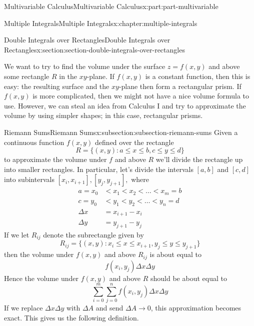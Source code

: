 \documentclass[twoside,10pt,]{tufte-book}
\numberwithin{equation}{part}
\begin{document}
\begin{partptx}{Multivariable Calculus}{}{Multivariable Calculus}{}{}{x:part:part-multivariable}
\begin{chapterptx}{Multiple Integrals}{}{Multiple Integrals}{}{}{x:chapter:multiple-integrals}
\begin{sectionptx}{Double Integrals over Rectangles}{}{Double Integrals over Rectangles}{}{}{x:section:section-double-integrals-over-rectangles}
\begin{introduction}{}%
We want to try to find the volume under the surface \(z = f(x,y)\) and above some rectangle \(R\) in the \(xy\)-plane. If \(f(x,y)\) is a constant function, then this is easy: the resulting surface and the \(xy\)-plane then form a rectangular prism. If \(f(x,y)\) is more complicated, then we might not have a nice volume formula to use. However, we can steal an idea from Calculus I and try to approximate the volume by using simpler shapes; in this case, rectangular prisms.%
\end{introduction}%
%
%
\typeout{************************************************}
\typeout{************************************************}
%
\begin{subsectionptx}{Riemann Sums}{}{Riemann Sums}{}{}{x:subsection:subsection-riemann-sums}
Given a continuous function \(f(x,y)\) defined over the rectangle%
\begin{equation*}
R = \{(x,y) : a\leq x\leq b, c\leq y\leq d\}
\end{equation*}
to approximate the volume under \(f\) and above \(R\) we'll divide the rectangle up into smaller rectangles. In particular, let's divide the intervals \([a,b]\) and \([c,d]\) into subintervals \([x_{i},x_{i+1}], [y_{j},y_{j+1}],\) where%
\begin{align*}
a = x_{0} & < x_{1} < x_{2} < \dots < x_{m} = b \\
c = y_{0} & < y_{1} < y_{2} < \dots < y_{n} = d \\
\Delta x & = x_{i+1} - x_{i} \\
\Delta y & = y_{j+1} - y_{j} 
\end{align*}
If we let \(R_{ij}\) denote the subrectangle given by%
\begin{equation*}
R_{ij} = \{(x,y) : x_{i}\leq x\leq x_{i+1}, y_{j}\leq y\leq y_{j+1}\}
\end{equation*}
then the volume under \(f(x,y)\) and above \(R_{ij}\) is about equal to%
\begin{equation*}
f(x_{i},y_{j})\Delta x\Delta y
\end{equation*}
Hence the volume under \(f(x,y)\) and above \(R\) should be about equal to%
\begin{equation*}
\sum_{i=0}^{m}\sum_{j=0}^{n}f(x_{i},y_{j})\Delta x\Delta y
\end{equation*}
If we replace \(\Delta x\Delta y\) with \(\Delta A\) and send \(\Delta A\to0\), this approximation becomes exact. This gives us the following definition.%

\end{subsectionptx}
\end{sectionptx}
\end{chapterptx}
\end{partptx}
\end{document}

